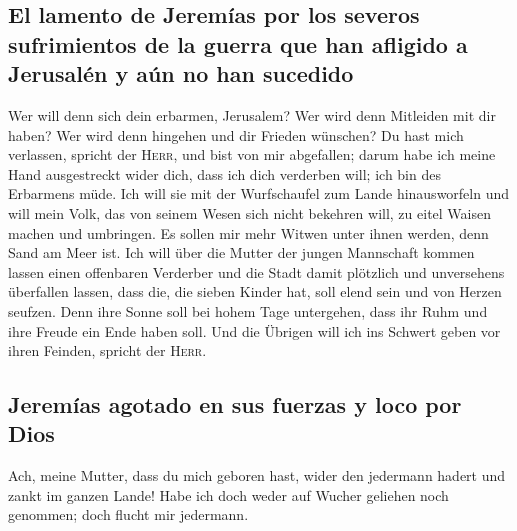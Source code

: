 \hypertarget{el-lamento-de-jeremuxedas-por-los-severos-sufrimientos-de-la-guerra-que-han-afligido-a-jerusaluxe9n-y-auxfan-no-han-sucedido}{%
\subsection{El lamento de Jeremías por los severos sufrimientos de la
guerra que han afligido a Jerusalén y aún no han
sucedido}\label{el-lamento-de-jeremuxedas-por-los-severos-sufrimientos-de-la-guerra-que-han-afligido-a-jerusaluxe9n-y-auxfan-no-han-sucedido}}

 Wer will denn sich dein erbarmen, Jerusalem? Wer wird
denn Mitleiden mit dir haben? Wer wird denn hingehen und dir Frieden
wünschen?  Du hast mich verlassen, spricht der
\textsc{Herr}, und bist von mir abgefallen; darum habe ich meine Hand
ausgestreckt wider dich, dass ich dich verderben will; ich bin des
Erbarmens müde.  Ich will sie mit der Wurfschaufel zum
Lande hinausworfeln und will mein Volk, das von seinem Wesen sich nicht
bekehren will, zu eitel Waisen machen und umbringen.  Es
sollen mir mehr Witwen unter ihnen werden, denn Sand am Meer ist. Ich
will über die Mutter der jungen Mannschaft kommen lassen einen
offenbaren Verderber und die Stadt damit plötzlich und unversehens
überfallen lassen,  dass die, die sieben Kinder hat, soll
elend sein und von Herzen seufzen. Denn ihre Sonne soll bei hohem Tage
untergehen, dass ihr Ruhm und ihre Freude ein Ende haben soll. Und die
Übrigen will ich ins Schwert geben vor ihren Feinden, spricht der
\textsc{Herr}.

\hypertarget{jeremuxedas-agotado-en-sus-fuerzas-y-loco-por-dios}{%
\subsection{Jeremías agotado en sus fuerzas y loco por
Dios}\label{jeremuxedas-agotado-en-sus-fuerzas-y-loco-por-dios}}

 Ach, meine Mutter, dass du mich geboren hast, wider den
jedermann hadert und zankt im ganzen Lande! Habe ich doch weder auf
Wucher geliehen noch genommen; doch flucht mir jedermann.

